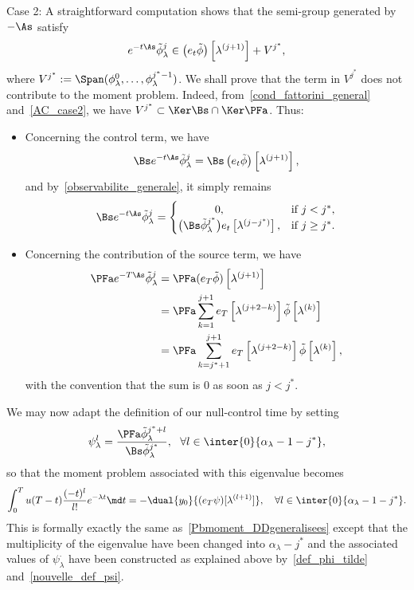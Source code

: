 \begin{step}{Case 2:}
A straightforward computation shows that the semi-group generated by $-\As$ satisfy
\[
e^{-t\As} \tilde{\phi}_\lambda^j \in \left(e_t \tilde{\phi}\right)\left[\lambda^{(j+1)}\right] + V^{j^*},
\]
where $V^{j^*} :=
\Span (\phi_\lambda^0,\ldots,\phi_\lambda^{j^*-1})$. We shall prove that the term in $V^{j^*}$ does not contribute to the moment problem. Indeed, from~\eqref{cond_fattorini_general} and~\eqref{AC_case2}, we have $V^{j^*} \subset \Ker \Bs \cap \Ker \PFa$. Thus:
\begin{itemize}
\item Concerning the control term, we have
\[
\Bs e^{-t\As} \tilde{\phi}_\lambda^j = \Bs \left(e_t \tilde{\phi}\right)\left[\lambda^{(j+1)}\right],
\]
and by~\eqref{observabilite_generale}, it simply remains
\[
\Bs e^{-t\As} \tilde{\phi}_\lambda^j =
\begin{cases}
\mkern60mu 0,& \text{if } j<j^*,\\
\big(\Bs \tilde{\phi}_{\lambda}^{j^*}\big) e_t\left[\lambda^{(j-j^*)}\right],& \text{if }j\geq j^*.
\end{cases}
\]
\item Concerning the contribution of the source term, we have
\begin{align*}
\PFa e^{-T\As} \tilde{\phi}_\lambda^j & = \PFa (e_T \tilde{\phi})\left[\lambda^{(j+1)}\right]\\
& = \PFa \sum_{k=1}^{j+1} e_T\left[\lambda^{(j+2-k)}\right] \tilde{\phi}\left[\lambda^{(k)}\right]\\
& = \PFa \sum_{k=j^*+1}^{j+1} e_T\left[\lambda^{(j+2-k)}\right] \tilde{\phi}\left[\lambda^{(k)}\right],
\end{align*}
with the convention that the sum is $0$ as soon as $j<j^*$.
\end{itemize}
We may now adapt the definition of our null-control time by setting
\begin{equation}\label{nouvelle_def_psi}
\psi_\lambda^l = \frac{\PFa \tilde{\phi}_\lambda^{j^*+l}}{\Bs \tilde{\phi}_\lambda^{j^*}}, \ \ \forall l\in \inter{0}{\alpha_\lambda-1-j^*},
\end{equation}
so that the moment problem associated with this eigenvalue becomes
\begin{equation*}
\int_0^T u(T-t) \frac{(-t)^l}{l!} e^{-\lambda t} \md t = -\dual{y_0}{(e_T \psi)[\lambda^{(l+1)}]}, \quad \forall l \in \inter{0}{\alpha_\lambda-1-j^*}.
\end{equation*}
This is formally exactly the same as~\eqref{Pbmoment_DDgeneralisees} except that the multiplicity of the eigenvalue have been changed into $\alpha_\lambda-j^*$ and the associated values of $\psi_\lambda^\cdot$ have been constructed as explained above by~\eqref{def_phi_tilde} and~\eqref{nouvelle_def_psi}.
\end{step}

